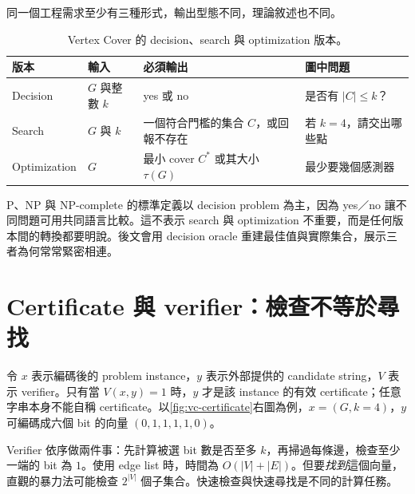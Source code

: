 \documentclass[11pt,a4paper,oneside,openany]{book}
\begin{document}
同一個工程需求至少有三種形式，輸出型態不同，理論敘述也不同。

\begin{table}[htbp]
\centering
\caption{Vertex Cover 的 decision、search 與 optimization 版本。}
\label{tab:vc-three-versions}
\begin{tabularx}{\textwidth}{@{}lYYY@{}}
\toprule
版本 & 輸入 & 必須輸出 & 圖中問題 \\
\midrule
Decision & $G$ 與整數 $k$ & yes 或 no & 是否有 $|C|\le k$？ \\
Search & $G$ 與 $k$ & 一個符合門檻的集合 $C$，或回報不存在 & 若 $k=4$，請交出哪些點 \\
Optimization & $G$ & 最小 cover $C^*$ 或其大小 $\tau(G)$ & 最少要幾個感測器 \\
\bottomrule
\end{tabularx}
\end{table}

P、NP 與 NP-complete 的標準定義以 decision problem 為主，因為 yes／no 讓不同問題可用共同語言比較。這不表示 search 與 optimization 不重要，而是任何版本間的轉換都要明說。後文會用 decision oracle 重建最佳值與實際集合，展示三者為何常常緊密相連。

\section{Certificate 與 verifier：檢查不等於尋找}
令 $x$ 表示編碼後的 problem instance，$y$ 表示外部提供的 candidate string，$V$ 表示 verifier。只有當 $V(x,y)=1$ 時，$y$ 才是該 instance 的有效 certificate；任意字串本身不能自稱 certificate。以\cref{fig:vc-certificate}右圖為例，$x=(G,k=4)$，$y$ 可編碼成六個 bit 的向量 $(0,1,1,1,1,0)$。

Verifier 依序做兩件事：先計算被選 bit 數是否至多 $k$，再掃過每條邊，檢查至少一端的 bit 為 $1$。使用 edge list 時，時間為 $O(|V|+|E|)$。但要\emph{找到}這個向量，直觀的暴力法可能檢查 $2^{|V|}$ 個子集合。快速檢查與快速尋找是不同的計算任務。
\end{document}
